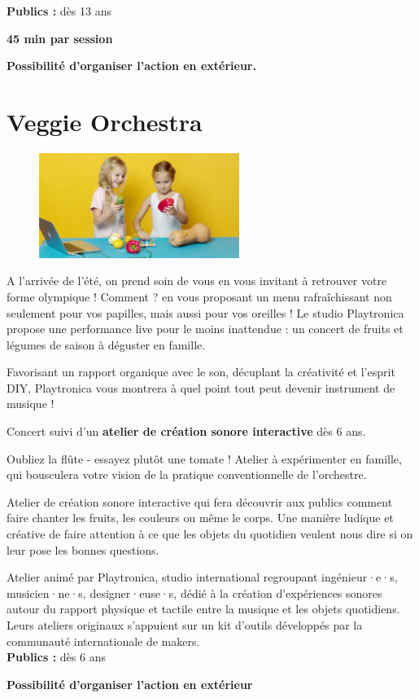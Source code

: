 \documentclass[fontsize=12pt]{scrartcl} %
\numberwithin{equation}{section} %
\numberwithin{table}{section} %
\begin{document}
\noindent
\textbf{Publics :} dès 13 ans

\noindent
\textbf{45 min par session}

\noindent 
\textbf{Possibilité d'organiser l'action en extérieur.}

\pagebreak

\section{Veggie Orchestra}
\label{app:veggie}

\begin{figure}
\centering
\includegraphics[width=6.5cm]{img/veggie}
\label{fig:veggie}
\end{figure}

A l'arrivée de l'été, on prend soin de vous en vous invitant à retrouver votre forme olympique ! Comment ? en vous proposant un menu rafraîchissant non seulement pour vos papilles, mais aussi pour vos oreilles ! Le studio Playtronica propose une performance live pour le moins inattendue : un concert de fruits et légumes de saison à déguster en famille.
 
Favorisant un rapport organique avec le son, décuplant la créativité et l'esprit DIY, Playtronica vous montrera à quel point tout peut devenir instrument de musique !
 
Concert suivi d'un \textbf{atelier de création sonore interactive} dès 6 ans.
 
Oubliez la flûte - essayez plutôt une tomate ! Atelier à expérimenter en famille, qui  bousculera votre vision de la  pratique conventionnelle de l'orchestre.
 
Atelier de création sonore interactive qui fera découvrir aux publics comment faire chanter les fruits, les couleurs ou même le corps. Une manière ludique et créative de faire attention à ce que les objets du quotidien veulent nous dire si on leur pose les bonnes questions.
 
Atelier animé par Playtronica, studio international regroupant ingénieur·e·s, musicien·ne·s, designer·euse·s, dédié à la création d'expériences sonores autour du rapport physique et tactile entre la musique et les objets quotidiens. Leurs ateliers originaux s'appuient sur un kit d'outils développés par la communauté internationale de makers.\\

\noindent
\textbf{Publics :} dès 6 ans

\noindent
\textbf{Possibilité d’organiser l’action en extérieur}
\end{document}
